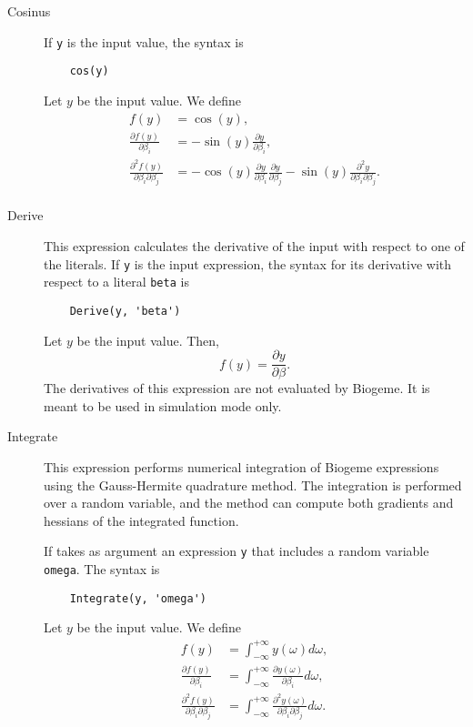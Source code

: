 \documentclass[12pt,a4paper]{article}
\begin{document}
\begin{description}
 \item[Cosinus] If \lstinline+y+ is the input value, the syntax is
  \begin{lstlisting}
    cos(y)
  \end{lstlisting}
  Let $y$ be the input value. We define
  \begin{align*}
      f(y) &= \cos(y), \\
      \frac{\partial f(y)}{\partial \beta_i} &= -\sin(y) \frac{\partial y}{\partial \beta_i},\\
      \frac{\partial^2 f(y)}{\partial \beta_i\partial \beta_j} &= -\cos(y) \frac{\partial y}{\partial \beta_i} \frac{\partial y}{\partial \beta_j}- \sin(y)\frac{\partial^2 y}{\partial \beta_i\partial \beta_j}.\\
  \end{align*}
    
\item[Derive] This expression calculates the derivative of the input
  with respect to one of the literals. If \lstinline+y+ is the
  input expression, the syntax for its derivative with respect to a
  literal \lstinline+beta+ is
  \begin{lstlisting}
    Derive(y, 'beta')
  \end{lstlisting}
  Let $y$ be the input value. Then,
  \[
  f(y) = \frac{\partial y}{\partial \beta}.
  \]
  The derivatives of this expression are not evaluated by Biogeme. It is meant to be used in simulation mode only.

\item[Integrate] This expression performs numerical integration
of Biogeme expressions using the Gauss-Hermite quadrature method. The integration is performed over a random variable, and the method can compute both gradients and hessians of the integrated function.

If takes as argument an expression
  \lstinline+y+ that includes a random variable
  \lstinline+omega+. The syntax is
  \begin{lstlisting}
    Integrate(y, 'omega')
  \end{lstlisting}
  Let $y$ be the input value. We define
  \begin{align*}
    f(y) &= \int_{-\infty}^{+\infty} y(\omega) d\omega, \\
    \frac{\partial f(y)}{\partial \beta_i} &= \int_{-\infty}^{+\infty} \frac{\partial y(\omega)}{\partial \beta_i} d\omega,\\
    \frac{\partial^2 f(y)}{\partial \beta_i\partial \beta_j} &=  \int_{-\infty}^{+\infty} \frac{\partial^2 y(\omega)}{\partial \beta_i \partial \beta_j} d\omega.\\
  \end{align*}


\end{description}
\end{document}
